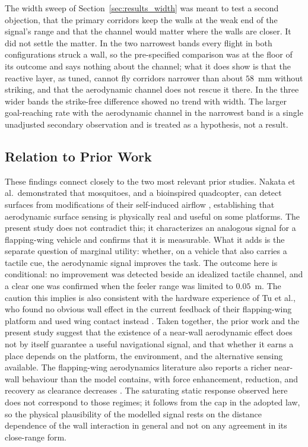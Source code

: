 \documentclass[final,5p,times]{elsarticle}
\begin{document}
The width sweep of Section~\ref{sec:results_width} was meant to test a second objection, that the primary corridors keep the walls at the weak end of the signal's range and that the channel would matter where the walls are closer. It did not settle the matter. In the two narrowest bands every flight in both configurations struck a wall, so the pre-specified comparison was at the floor of its outcome and says nothing about the channel; what it does show is that the reactive layer, as tuned, cannot fly corridors narrower than about $58$~mm without striking, and that the aerodynamic channel does not rescue it there. In the three wider bands the strike-free difference showed no trend with width. The larger goal-reaching rate with the aerodynamic channel in the narrowest band is a single unadjusted secondary observation and is treated as a hypothesis, not a result.

\subsection{Relation to Prior Work}
\label{sec:disc_prior}

These findings connect closely to the two most relevant prior studies. Nakata et al.\ demonstrated that mosquitoes, and a bioinspired quadcopter, can detect surfaces from modifications of their self-induced airflow \cite{nakata2020aerodynamic}, establishing that aerodynamic surface sensing is physically real and useful on some platforms. The present study does not contradict this; it characterizes an analogous signal for a flapping-wing vehicle and confirms that it is measurable. What it adds is the separate question of marginal utility: whether, on a vehicle that also carries a tactile cue, the aerodynamic signal improves the task. The outcome here is conditional: no improvement was detected beside an idealized tactile channel, and a clear one was confirmed when the feeler range was limited to $0.05$~m. The caution this implies is also consistent with the hardware experience of Tu et al., who found no obvious wall effect in the current feedback of their flapping-wing platform and used wing contact instead \cite{tu2019acting}. Taken together, the prior work and the present study suggest that the existence of a near-wall aerodynamic effect does not by itself guarantee a useful navigational signal, and that whether it earns a place depends on the platform, the environment, and the alternative sensing available. The flapping-wing aerodynamics literature also reports a richer near-wall behaviour than the model contains, with force enhancement, reduction, and recovery as clearance decreases \cite{lu2016ground}. The saturating static response observed here does not correspond to those regimes; it follows from the cap in the adopted law, so the physical plausibility of the modelled signal rests on the distance dependence of the wall interaction in general and not on any agreement in its close-range form.
\end{document}

